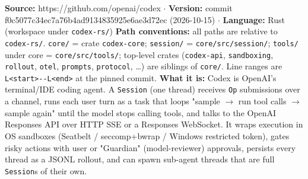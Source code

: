 \textbf{Source:} https://github.com/openai/codex $\cdot$ \textbf{Version:} commit f0c5077c34ec7a76b4ad9134835925e6ae3d72ec (2026-10-15) $\cdot$ \textbf{Language:} Rust (workspace under \texttt{codex-\allowbreak{}rs/\allowbreak{}})
\textbf{Path conventions:} all paths are relative to \texttt{codex-\allowbreak{}rs/\allowbreak{}}. \texttt{core/\allowbreak{}} = crate \texttt{codex-\allowbreak{}core}; \texttt{session/\allowbreak{}} = \texttt{core/\allowbreak{}src/\allowbreak{}session/\allowbreak{}}; \texttt{tools/\allowbreak{}} under core = \texttt{core/\allowbreak{}src/\allowbreak{}tools/\allowbreak{}}; top-level crates (\texttt{codex-\allowbreak{}api}, \texttt{sandboxing}, \texttt{rollout}, \texttt{otel}, \texttt{prompts}, \texttt{protocol}, \ldots{}) are siblings of \texttt{core/\allowbreak{}}. Line ranges are \texttt{L<start>-\allowbreak{}-\allowbreak{}L<end>} at the pinned commit.
\textbf{What it is:} Codex is OpenAI's terminal/IDE coding agent. A \texttt{Session} (one thread) receives \texttt{Op} submissions over a channel, runs each user turn as a task that loops "sample $\rightarrow$ run tool calls $\rightarrow$ sample again" until the model stops calling tools, and talks to the OpenAI Responses API over HTTP SSE or a Responses WebSocket. It wraps execution in OS sandboxes (Seatbelt / seccomp+bwrap / Windows restricted token), gates risky actions with user or "Guardian" (model-reviewer) approvals, persists every thread as a JSONL rollout, and can spawn sub-agent threads that are full \texttt{Session}s of their own.

